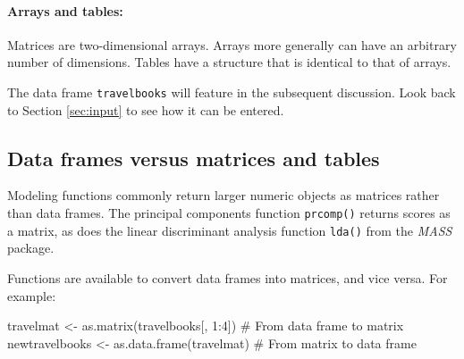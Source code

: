 \documentclass{tufte-book}\usepackage[]{graphicx}\usepackage[]{color}
\newcommand{\txtt}[1]{\texttt{#1}}
\newcommand{\margtt}[1]{{\footnotesize \texttt{#1}}}
\begin{document}
\paragraph{Arrays and tables:} Matrices are two-dimensional arrays.
Arrays more generally can have an arbitrary number of dimensions.
Tables have a structure that is identical to that of arrays.

The data frame \txtt{travelbooks} will feature in the subsequent
discussion.  Look back to Section \ref{sec:input} to see how it can be
entered.



\subsection{Data frames versus matrices and tables}\label{ss:df-mat}

  Modeling functions commonly return
larger numeric objects as matrices rather than data frames. The
principal components function \margtt{prcomp()} returns scores as a
matrix, as does the linear discriminant analysis function
\margtt{lda()} from the {\em MASS} package.

Functions are available to convert data frames into matrices, and vice
versa. For example:
\begin{Schunk}
\begin{Sinput}
travelmat <- as.matrix(travelbooks[, 1:4])
  # From data frame to matrix
newtravelbooks <- as.data.frame(travelmat)
  # From matrix to data frame
\end{Sinput}
\end{Schunk}

\enlargethispage{24pt}
\end{document}
